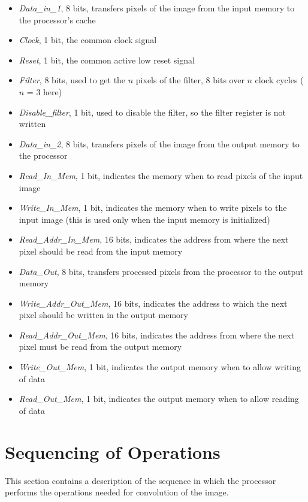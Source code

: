 \documentclass[11pt,a4paper]{article}
\begin{document}
\begin{itemize}
		\item \textit{Data\_in\_1}, 8 bits, transfers pixels of the image from the input memory to the processor's cache
		\item \textit{Clock}, 1 bit, the common clock signal
		\item \textit{Reset}, 1 bit, the common active low reset signal
		\item \textit{Filter}, 8 bits, used to get the $n$ pixels of the filter, 8 bits over $n$ clock cycles ($n$ = 3 here)
		\item \textit{Disable\_filter}, 1 bit, used to disable the filter, so the filter register is not written
		\item \textit{Data\_in\_2}, 8 bits, transfers pixels of the image from the output memory to the processor
		\item \textit{Read\_In\_Mem}, 1 bit, indicates the memory when to read pixels of the input image
		\item \textit{Write\_In\_Mem}, 1 bit, indicates the memory when to write pixels to the input image (this is used only when the input memory is initialized)
		\item \textit{Read\_Addr\_In\_Mem}, 16 bits, indicates the address from where the next pixel should be read from the input memory
		\item \textit{Data\_Out}, 8 bits, transfers processed pixels from the processor to the output memory
		\item \textit{Write\_Addr\_Out\_Mem}, 16 bits, indicates the address to which the next pixel should be written in the output memory
		\item \textit{Read\_Addr\_Out\_Mem}, 16 bits, indicates the address from where the next pixel must be read from the output memory
		\item \textit{Write\_Out\_Mem}, 1 bit, indicates the output memory when to allow writing of data
		\item \textit{Read\_Out\_Mem}, 1 bit, indicates the output memory when to allow reading of data
\end{itemize}


\section{Sequencing of Operations}
\label{sec:sequencing}

This section contains a description of the sequence in which the processor performs the operations needed for convolution of the image. 
\end{document}
